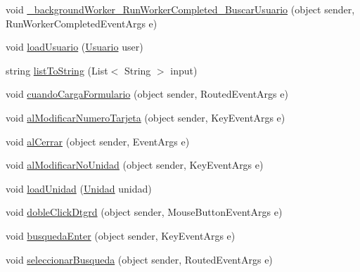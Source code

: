 \begin{DoxyCompactItemize}
\item 
void \hyperlink{class_proyecto___integrador__3_1_1_reportes_1_1_reporte_frecuencia_de_uso_a4009e26dcce0ad4f21848fa2af4debb9}{\-\_\-background\-Worker\-\_\-\-Run\-Worker\-Completed\-\_\-\-Buscar\-Usuario} (object sender, Run\-Worker\-Completed\-Event\-Args e)
\item 
void \hyperlink{class_proyecto___integrador__3_1_1_reportes_1_1_reporte_frecuencia_de_uso_a2f3f5d9e8de8f54d2031cb05f67d514b}{load\-Usuario} (\hyperlink{class_proyecto___integrador__3_1_1_tipos_dato_1_1_usuario}{Usuario} user)
\item 
string \hyperlink{class_proyecto___integrador__3_1_1_reportes_1_1_reporte_frecuencia_de_uso_a89175d2bfbb547618d00e07c74b2c7ab}{list\-To\-String} (List$<$ String $>$ input)
\item 
void \hyperlink{class_proyecto___integrador__3_1_1_reportes_1_1_reporte_frecuencia_de_uso_a946fe04d8a5fec967f095b989f5a8277}{cuando\-Carga\-Formulario} (object sender, Routed\-Event\-Args e)
\item 
void \hyperlink{class_proyecto___integrador__3_1_1_reportes_1_1_reporte_frecuencia_de_uso_a251221ea583a538202260b210e1bdc6e}{al\-Modificar\-Numero\-Tarjeta} (object sender, Key\-Event\-Args e)
\item 
void \hyperlink{class_proyecto___integrador__3_1_1_reportes_1_1_reporte_frecuencia_de_uso_afd0c390a99896fc7030fee9239e1c52c}{al\-Cerrar} (object sender, Event\-Args e)
\item 
void \hyperlink{class_proyecto___integrador__3_1_1_reportes_1_1_reporte_frecuencia_de_uso_ab492b354529c37416df38afe0c49a20d}{al\-Modificar\-No\-Unidad} (object sender, Key\-Event\-Args e)
\item 
void \hyperlink{class_proyecto___integrador__3_1_1_reportes_1_1_reporte_frecuencia_de_uso_a990d1ef15326a4a269e1c28840ca0876}{load\-Unidad} (\hyperlink{class_proyecto___integrador__3_1_1_tipos_dato_1_1_unidad}{Unidad} unidad)
\item 
void \hyperlink{class_proyecto___integrador__3_1_1_reportes_1_1_reporte_frecuencia_de_uso_a7e667426a6de02c099f4ad03df9c7853}{doble\-Click\-Dtgrd} (object sender, Mouse\-Button\-Event\-Args e)
\item 
void \hyperlink{class_proyecto___integrador__3_1_1_reportes_1_1_reporte_frecuencia_de_uso_aabe66d19df09b28ab8f1c034935091c0}{busqueda\-Enter} (object sender, Key\-Event\-Args e)
\item 
void \hyperlink{class_proyecto___integrador__3_1_1_reportes_1_1_reporte_frecuencia_de_uso_ab7a4518073890159b8582f0a55979295}{seleccionar\-Busqueda} (object sender, Routed\-Event\-Args e)

\end{DoxyCompactItemize}

